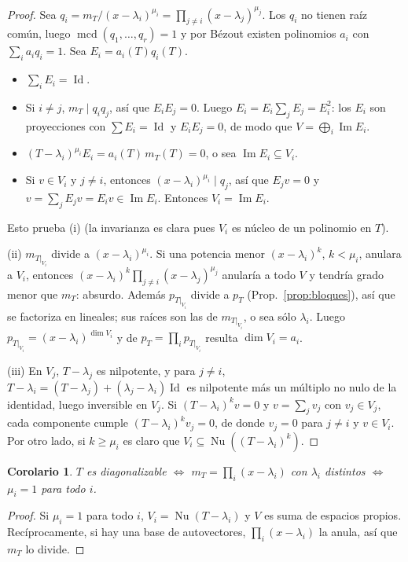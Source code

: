\documentclass{article}
\DeclareMathOperator{\Ima}{Im}
\DeclareMathOperator{\Nu}{Nu}
\DeclareMathOperator{\mcd}{mcd}
\DeclareMathOperator{\Id}{Id}
\theoremstyle{plain}
\newtheorem{corolario}[teorema]{Corolario}
\theoremstyle{definition}
\theoremstyle{remark}
\begin{document}
\begin{proof}
    Sea \(q_i=m_T/(x-\lambda_i)^{\mu_i}=\prod_{j\ne i}(x-\lambda_j)^{\mu_j}\). Los \(q_i\) no tienen raíz común, luego \(\mcd(q_1,\dots,q_r)=1\) y por Bézout existen polinomios \(a_i\) con \(\sum_ia_iq_i=1\). Sea \(E_i=a_i(T)q_i(T)\).
    \begin{itemize}
        \item \(\sum_iE_i=\Id\).
        \item Si \(i\ne j\), \(m_T\mid q_iq_j\), así que \(E_iE_j=0\). Luego \(E_i=E_i\sum_jE_j=E_i^2\): los \(E_i\) son proyecciones con \(\sum E_i=\Id\) y \(E_iE_j=0\), de modo que \(V=\bigoplus_i\Ima E_i\).
        \item \((T-\lambda_i)^{\mu_i}E_i=a_i(T)\,m_T(T)=0\), o sea \(\Ima E_i\subseteq V_i\).
        \item Si \(v\in V_i\) y \(j\ne i\), entonces \((x-\lambda_i)^{\mu_i}\mid q_j\), así que \(E_jv=0\) y \(v=\sum_jE_jv=E_iv\in\Ima E_i\). Entonces \(V_i=\Ima E_i\).
    \end{itemize}
    Esto prueba (i) (la invarianza es clara pues \(V_i\) es núcleo de un polinomio en \(T\)).

    (ii) \(m_{T|_{V_i}}\) divide a \((x-\lambda_i)^{\mu_i}\). Si una potencia menor \((x-\lambda_i)^k\), \(k<\mu_i\), anulara a \(V_i\), entonces \((x-\lambda_i)^k\prod_{j\ne i}(x-\lambda_j)^{\mu_j}\) anularía a todo \(V\) y tendría grado menor que \(m_T\): absurdo. Además \(p_{T|_{V_i}}\) divide a \(p_T\) (Prop.~\ref{prop:bloques}), así que se factoriza en lineales; sus raíces son las de \(m_{T|_{V_i}}\), o sea sólo \(\lambda_i\). Luego \(p_{T|_{V_i}}=(x-\lambda_i)^{\dim V_i}\) y de \(p_T=\prod_ip_{T|_{V_i}}\) resulta \(\dim V_i=a_i\).

    (iii) En \(V_j\), \(T-\lambda_j\) es nilpotente, y para \(j\ne i\), \(T-\lambda_i=(T-\lambda_j)+(\lambda_j-\lambda_i)\Id\) es nilpotente más un múltiplo no nulo de la identidad, luego inversible en \(V_j\). Si \((T-\lambda_i)^kv=0\) y \(v=\sum_jv_j\) con \(v_j\in V_j\), cada componente cumple \((T-\lambda_i)^kv_j=0\), de donde \(v_j=0\) para \(j\ne i\) y \(v\in V_i\). Por otro lado, si \(k\ge\mu_i\) es claro que \(V_i\subseteq\Nu((T-\lambda_i)^k)\).
\end{proof}

\begin{corolario}\label{cor:diag}
    \(T\) es diagonalizable \(\iff\) \(m_T=\prod_i(x-\lambda_i)\) con \(\lambda_i\) distintos \(\iff\) \(\mu_i=1\) para todo \(i\).
\end{corolario}
\begin{proof}
    Si \(\mu_i=1\) para todo \(i\), \(V_i=\Nu(T-\lambda_i)\) y \(V\) es suma de espacios propios. Recíprocamente, si hay una base de autovectores, \(\prod_i(x-\lambda_i)\) la anula, así que \(m_T\) lo divide.
\end{proof}
\end{document}
